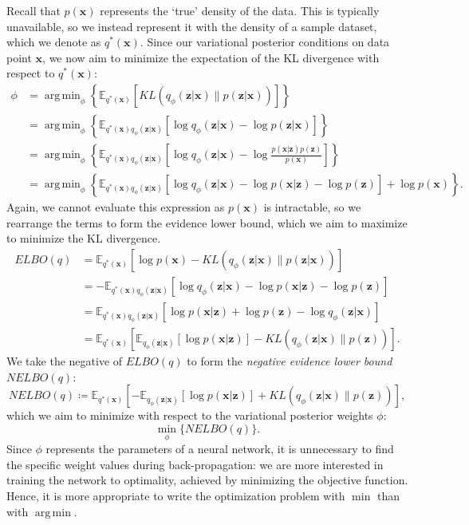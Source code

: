 \documentclass[honours,12pt, twoside]{unswthesis}
\newcommand{\E}{\mathbb{E}}
\DeclareMathOperator*{\argmin}{arg\,min}
\numberwithin{equation}{section}
\theoremstyle{definition}
\begin{document}
Recall that $p(\bm{x})$ represents the `true' density of the data. This is typically unavailable, so we instead represent it with the density of a sample dataset, which we denote as $q^*(\bm{x})$. Since our variational posterior conditions on data point $\bm{x}$, we now aim to minimize the expectation of the KL divergence with respect to $q^*(\bm{x})$:
\begin{align*}
\phi &=\argmin_\phi \left\lbrace\mathbb{E}_{q^*(\bm{x})}\left[KL(q_\phi(\bm{z}|\bm{x})\|p(\bm{z}|\bm{x}))\right]\right\rbrace\\
&= \argmin_\phi \left\lbrace\mathbb{E}_{q^*(\bm{x})q_\phi (\bm{z}|\bm{x})}\left[\log q_\phi(\bm{z}|\bm{x})-\log p(\bm{z}|\bm{x})\right]\right\rbrace\\
&=\argmin_\phi\left\lbrace\mathbb{E}_{q^*(\bm{x})q_\phi (\bm{z}|\bm{x})}\left[\log q_\phi(\bm{z}|\bm{x})-\log \frac{p(\bm{x}|\bm{z})p(\bm{z})}{p(\bm{x})}\right]\right\rbrace\\
&=\argmin_\phi\left\lbrace\mathbb{E}_{q^*(\bm{x})q_\phi (\bm{z}|\bm{x})}\left[\log q_\phi(\bm{z}|\bm{x})-\log p(\bm{x}|\bm{z})-\log p(\bm{z})\right]+\log p(\bm{x})\right\rbrace.
\end{align*} 
Again, we cannot evaluate this expression as $p(\bm{x})$ is intractable, so we rearrange the terms to form the evidence lower bound, which we aim to maximize to minimize the KL divergence.
\begin{align*}
ELBO(q)&=\mathbb{E}_{q^*(\bm{x})}[\log p(\bm{x})-KL(q_\phi(\bm{z}|\bm{x})\|p(\bm{z}|\bm{x}))]\\
&=-\mathbb{E}_{q^*(\bm{x})q_\phi(\bm{z}|\bm{x})}\left[\log q_\phi(\bm{z}|\bm{x})-\log p(\bm{x}|\bm{z})-\log p(\bm{z})\right]\\
&=\mathbb{E}_{q^*(\bm{x})q_\phi(\bm{z}|\bm{x})}\left[\log p(\bm{x}|\bm{z})+\log p(\bm{z})-\log q_\phi(\bm{z}|\bm{x})\right]\\
&=\mathbb{E}_{q^*(\bm{x})}\left[\E_{q_\phi(\bm{z}|\bm{x})}[\log p(\bm{x}|\bm{z})]-KL(q_\phi(\bm{z}|\bm{x})\|p(\bm{z}))\right].
\end{align*}
We take the negative of $ELBO(q)$ to form the \textit{negative evidence lower bound} $NELBO(q)$:
\begin{equation*}
NELBO(q)\coloneqq\mathbb{E}_{q^*(\bm{x})}\left[-\E_{q_\phi(\bm{z}|\bm{x})}[\log p(\bm{x}|\bm{z})]+KL(q_\phi(\bm{z}|\bm{x})\|p(\bm{z}))\right],
\end{equation*}
which we aim to minimize with respect to the variational posterior weights $\phi$:
\begin{equation}
\min_\phi \lbrace NELBO(q)\rbrace.
\end{equation}
Since $\phi$ represents the parameters of a neural network, it is unnecessary to find the specific weight values during back-propagation: we are more interested in training the network to optimality, achieved by minimizing the objective function. Hence, it is more appropriate to write the optimization problem with $\min$ than with $\argmin$.
\end{document}
